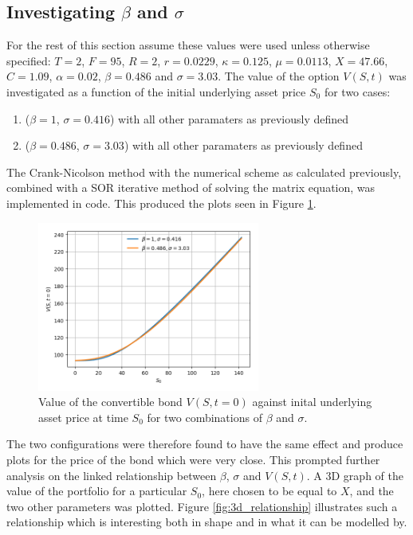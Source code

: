 \documentclass{article}
\begin{document}
\subsection{Investigating $\beta$ and $\sigma$}
For the rest of this section assume these values were used unless otherwise specified:
$T=2$, $F=95$, $R=2$, $r=0.0229$, $\kappa=0.125$, $\mu=0.0113$, $X=47.66$, $C=1.09$, $\alpha=0.02$, $\beta=0.486$ and $\sigma=3.03$.
The value of the option $V(S,t)$ was investigated as a function of the initial underlying asset
price $S_0$ for two cases:
\begin{enumerate}[1)]
  \item ($\beta=1$, $\sigma=0.416$) with all other paramaters as previously defined
  \item ($\beta=0.486$, $\sigma=3.03$) with all other paramaters as previously defined
\end{enumerate}
\par The Crank-Nicolson method with the numerical scheme as calculated previously, combined with a SOR iterative method of solving the matrix equation, was implemented in code.
This produced the plots seen in Figure \ref{fig:varying_s}.
\clearpage
\begin{figure}[!th]
\includegraphics[width=0.65\textwidth,center]{../images/european_varying_s.png}
\caption{Value of the convertible bond $V(S,t=0)$ against inital underlying asset price at time $S_0$ for two combinations of $\beta$ and $\sigma$.}
\label{fig:varying_s}
\end{figure}
The two configurations were therefore found to have the same effect and produce plots for the price of the bond which were very close.
This prompted further analysis on the linked relationship between $\beta$, $\sigma$ and $V(S,t)$.
A 3D graph of the value of the portfolio for a particular $S_0$, here chosen to be equal to $X$, and the two other parameters was plotted.
Figure \ref{fig:3d_relationship} illustrates such a relationship which is interesting both in shape and in what it can be modelled by.
\end{document}
